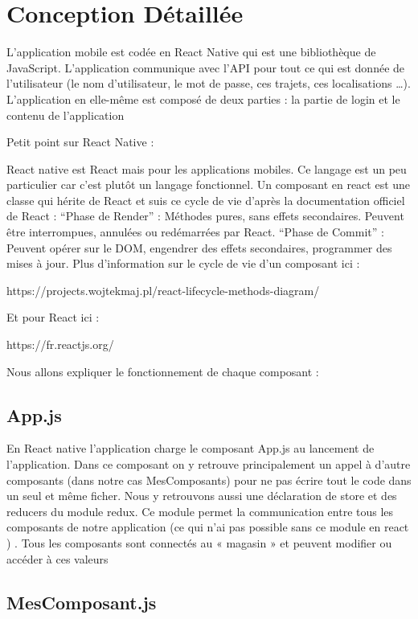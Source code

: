 \chapter{Conception Détaillée}

L’application mobile est codée en React Native qui est une bibliothèque de JavaScript. L’application communique avec l’API pour tout ce qui est donnée de l’utilisateur (le nom d’utilisateur, le mot de passe, ces trajets, ces localisations …). L’application en elle-même est composé de deux parties : la partie de login et le contenu de l’application

Petit point sur React Native :

React native est React mais pour les applications mobiles. Ce langage est un peu particulier car c’est plutôt un langage fonctionnel. Un composant en react est une classe qui hérite de React et suis ce cycle de vie d’après la documentation officiel de React  :
“Phase de Render” : Méthodes pures, sans effets secondaires. Peuvent être interrompues, annulées ou redémarrées par React.
“Phase de Commit” : Peuvent opérer sur le DOM, engendrer des effets secondaires, programmer des mises à jour.
Plus d’information sur le cycle de vie d’un composant ici :

https://projects.wojtekmaj.pl/react-lifecycle-methods-diagram/

Et pour React ici :

https://fr.reactjs.org/


Nous allons expliquer le fonctionnement de chaque composant :

\section{App.js}

En React native l’application charge le composant App.js au lancement de l’application. Dans ce composant on y retrouve principalement un appel à d’autre composants (dans notre cas MesComposants) pour ne pas écrire tout le code dans un seul et même ficher. Nous y retrouvons aussi une déclaration de store et des reducers du module redux. Ce module permet la communication entre tous les composants de notre application (ce qui n’ai pas possible sans ce module en react ) . Tous les composants sont connectés au « magasin » et peuvent modifier ou accéder à ces valeurs

\section{MesComposant.js}

